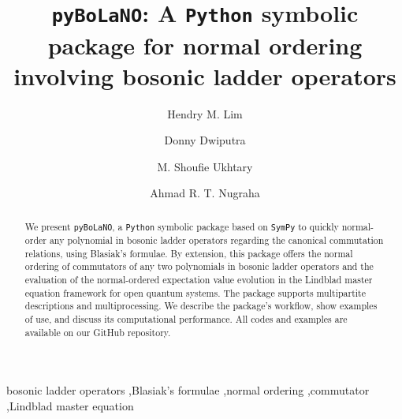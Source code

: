 \documentclass[5p, twocolumn, 10pt, sort&compress]{elsarticle}
\newcounter{bla}
\newenvironment{revision}{}{}
\begin{document}
\sloppy

\begin{frontmatter}

\title{\texttt{pyBoLaNO}: A \texttt{Python} symbolic package for normal ordering involving bosonic ladder operators}

\author[a,b]{Hendry M. Lim}
\author[c,a]{Donny Dwiputra}
\author[a]{M. Shoufie Ukhtary}
\author[a,d]{Ahmad R. T. Nugraha}

\address[a]{Research Center for Quantum Physics, National Research and Innovation Agency (BRIN), South Tangerang 15314, Indonesia}
\address[b]{Department of Physics, Faculty of Mathematics and Natural Sciences, Universitas Indonesia, Depok 16424, Indonesia}
\address[c]{Asia Pacific Center for Theoretical Physics, Pohang 37673, Korea}
\address[d]{Department of Engineering Physics, Telkom University, Bandung 40257, Indonesia}


\begin{abstract}
We present \texttt{pyBoLaNO}, a \texttt{Python} symbolic package based on \texttt{SymPy} to quickly normal-order any polynomial in bosonic ladder operators \begin{revision}regarding the canonical commutation relations, using Blasiak's formulae\end{revision}. By extension, this package offers the normal ordering of commutators of any two polynomials in bosonic ladder operators and the evaluation of the normal-ordered expectation value evolution in the Lindblad master equation framework for open quantum systems. The package supports multipartite descriptions and multiprocessing. We describe the package's workflow, show examples of use, and discuss its computational performance. All codes and examples are available on our GitHub repository.
\end{abstract}


\begin{keyword}
bosonic ladder operators \sep \begin{revision}Blasiak's formulae\end{revision} \sep normal ordering \sep commutator \sep Lindblad master equation

\end{keyword}

\end{frontmatter}
\end{document}
